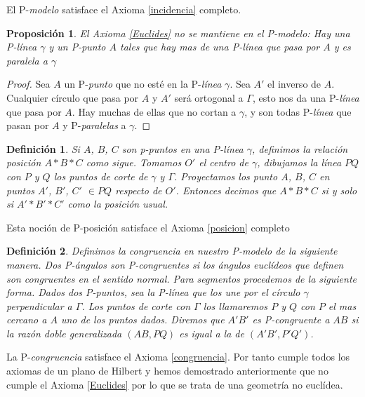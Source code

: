 \documentclass[a4paper]{amsart}
\theoremstyle{plain}
\newtheorem{definition}{Definición}
\newtheorem{proposition}{Proposición}
\begin{document}
El P-\textit{modelo} satisface el Axioma \ref{incidencia} completo.

\begin{proposition}
El Axioma \ref{Euclides} no se mantiene en el P-\textit{modelo}: Hay una P-\textit{línea} $\gamma$ y un P-\textit{punto} $A$ tales que hay mas de una P-\textit{línea} que pasa por $A$ y es paralela a $\gamma$
\end{proposition}

\begin{proof}
Sea $A$ un P-\textit{punto} que no esté en la P-\textit{línea} $\gamma$. Sea $A'$ el inverso de $A$. Cualquier círculo que pasa por $A$ y $A'$ será ortogonal a $\Gamma$, esto nos da una P-\textit{línea} que pasa por $A$. Hay muchas de ellas que no cortan a $\gamma$, y son todas P-\textit{línea} que pasan por $A$ y P-\textit{paralelas} a $\gamma$.
\end{proof}

\begin{definition}
Si $A$, $B$, $C$ son p-\textit{puntos} en una P-\textit{línea} $\gamma$, definimos la relación posición $A*B*C$ como sigue. Tomamos $O'$ el centro de $\gamma$, dibujamos la línea $PQ$ con $P$ y $Q$ los puntos de corte de $\gamma$ y $\Gamma$. Proyectamos los punto $A$, $B$, $C$ en puntos $A'$, $B'$, $C'$ $\in PQ$ respecto de $O'$. Entonces decimos que $A*B*C$ si y solo si $A'*B'*C'$ como la posición usual.
\end{definition}

Esta noción de P-posición satisface el Axioma \ref{posicion} completo

\begin{definition}
Definimos la congruencia en nuestro P-\textit{modelo} de la siguiente manera. Dos P-\textit{ángulos} son P-\textit{congruentes} si los ángulos euclídeos que definen son congruentes en el sentido normal.
Para segmentos procedemos de la siguiente forma. Dados dos P-\textit{puntos}, sea la P-\textit{línea} que los une por el círculo $\gamma$ perpendicular a $\Gamma$. Los puntos de corte con $\Gamma$ los llamaremos $P$ y $Q$ con $P$ el mas cercano a $A$ uno de los puntos dados. Diremos que $A'B'$ es P-\textit{congruente} a $AB$ si la razón doble generalizada $(AB,PQ)$ es igual a la de $(A'B',P'Q')$.
\end{definition}

La P-\textit{congruencia} satisface el Axioma \ref{congruencia}. Por tanto cumple todos los axiomas de un plano de Hilbert y hemos demostrado anteriormente que no cumple el Axioma \ref{Euclides} por lo que se trata de una geometría no euclídea.
\end{document}
